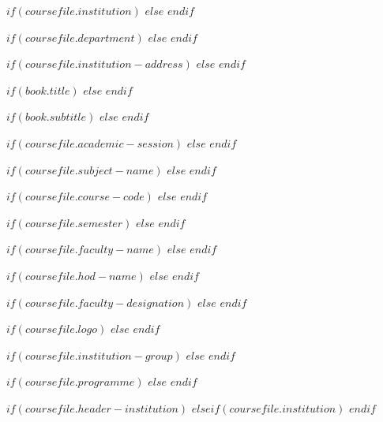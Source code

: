 $if(coursefile.institution)$
\newcommand{\cfInstitution}{$coursefile.institution$}
$else$
\newcommand{\cfInstitution}{}
$endif$

$if(coursefile.department)$
\newcommand{\cfDepartment}{$coursefile.department$}
$else$
\newcommand{\cfDepartment}{}
$endif$

$if(coursefile.institution-address)$
\newcommand{\cfInstitutionAddress}{$coursefile.institution-address$}
$else$
\newcommand{\cfInstitutionAddress}{}
$endif$

$if(book.title)$
\newcommand{\cfTitle}{$book.title$}
$else$
\newcommand{\cfTitle}{Course File Compendium}
$endif$

$if(book.subtitle)$
\newcommand{\cfSubtitle}{$book.subtitle$}
$else$
\newcommand{\cfSubtitle}{}
$endif$

$if(coursefile.academic-session)$
\newcommand{\cfSession}{$coursefile.academic-session$}
$else$
\newcommand{\cfSession}{Academic Session}
$endif$

$if(coursefile.subject-name)$
\newcommand{\cfSubjectName}{$coursefile.subject-name$}
$else$
\newcommand{\cfSubjectName}{}
$endif$

$if(coursefile.course-code)$
\newcommand{\cfCourseCode}{$coursefile.course-code$}
$else$
\newcommand{\cfCourseCode}{}
$endif$

$if(coursefile.semester)$
\newcommand{\cfSemester}{$coursefile.semester$}
$else$
\newcommand{\cfSemester}{}
$endif$

$if(coursefile.faculty-name)$
\newcommand{\cfFacultyName}{$coursefile.faculty-name$}
$else$
\newcommand{\cfFacultyName}{}
$endif$

$if(coursefile.hod-name)$
\newcommand{\cfHodName}{$coursefile.hod-name$}
$else$
\newcommand{\cfHodName}{}
$endif$

$if(coursefile.faculty-designation)$
\newcommand{\cfFacultyDesignation}{$coursefile.faculty-designation$}
$else$
\newcommand{\cfFacultyDesignation}{}
$endif$

$if(coursefile.logo)$
\newcommand{\cfLogo}{$coursefile.logo$}
$else$
\newcommand{\cfLogo}{}
$endif$

$if(coursefile.institution-group)$
\newcommand{\cfInstitutionGroup}{$coursefile.institution-group$}
$else$
\newcommand{\cfInstitutionGroup}{}
$endif$

$if(coursefile.programme)$
\newcommand{\cfProgramme}{$coursefile.programme$}
$else$
\newcommand{\cfProgramme}{}
$endif$

$if(coursefile.header-institution)$
\renewcommand{\GcetHeaderInstitution}{$coursefile.header-institution$}
$elseif(coursefile.institution)$
\renewcommand{\GcetHeaderInstitution}{\MakeUppercase{$coursefile.institution$}}
$endif$

